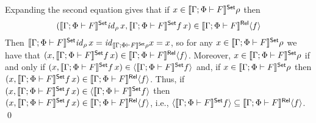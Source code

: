 \documentclass{lmcs}
\theoremstyle{plain}\newtheorem{satz}[thm]{Satz}
\renewcommand{\id}{\mathit{id}}
\begin{document}
{Expanding the second equation gives that if $x \in \llbracket{\Gamma;
  \Phi \vdash F}\rrbracket^{\mathsf{Set}}\rho$ then
\[(\setsem{\Gamma; \Phi \vdash F}\id_{\rho}\, x, \setsem{\Gamma;
  \Phi \vdash F} f\, x) \in \relsem{\Gamma; \Phi \vdash F}\graph{f}\]
Then $\setsem{\Gamma; \Phi \vdash F}\id_{\rho}\, x =
\id_{\setsem{\Gamma; \Phi \vdash F}\rho} x = x$, so for any $x \in
\llbracket{\Gamma; \Phi \vdash F}\rrbracket^{\mathsf{Set}}\rho$ we have that $(x, \llbracket{\Gamma;
  \Phi \vdash F}\rrbracket^{\mathsf{Set}}f\, x) \in \llbracket{\Gamma; \Phi \vdash F}\rrbracket^{\mathsf{Rel}}\langle {f} \rangle$.
Moreover, $x \in \llbracket{\Gamma; \Phi \vdash F}\rrbracket^{\mathsf{Set}}\rho$ if and only if
$(x, \llbracket{\Gamma; \Phi \vdash F}\rrbracket^{\mathsf{Set}} f\, x) \in \langle {\llbracket{\Gamma;
    \Phi \vdash F}\rrbracket^{\mathsf{Set}}f} \rangle$ and, if $x \in \llbracket{\Gamma; \Phi \vdash
  F}\rrbracket^{\mathsf{Set}}\rho$ then $(x, \llbracket{\Gamma; \Phi \vdash F}\rrbracket^{\mathsf{Set}} f\, x) \in
\llbracket{\Gamma; \Phi \vdash F}\rrbracket^{\mathsf{Rel}} \langle {f} \rangle$. Thus, if $(x, \llbracket{\Gamma;
  \Phi \vdash F}\rrbracket^{\mathsf{Set}} f\, x) \in \langle {\llbracket{\Gamma; \Phi \vdash F}\rrbracket^{\mathsf{Set}}f} \rangle$
then $(x, \llbracket{\Gamma; \Phi \vdash F}\rrbracket^{\mathsf{Set}} f\, x) \in \llbracket{\Gamma;
  \Phi \vdash F}\rrbracket^{\mathsf{Rel}} \langle {f} \rangle$, i.e., $\langle {\llbracket{\Gamma; \Phi \vdash
    F}\rrbracket^{\mathsf{Set}}f} \rangle \subseteq \llbracket{\Gamma; \Phi \vdash F}\rrbracket^{\mathsf{Rel}} \langle {f} \rangle$.  \qed

\begin{comment}

\begin{proof}
First observe that $(f, \id_{\rho'}) : \graph{f} \to \Eq_{\rho'}$ and
$(\id_{\rho}, f) : \Eq_{\rho} \to \graph{f}$ are morphisms of relation
environments.  Applying Lemma~\ref{lem:rel-transf-morph} to each of
these observations gives that
\begin{equation}\label{eq:graph-one}
(\setsem{\Gamma; \Phi \vdash F}f, \setsem{\Gamma; \Phi \vdash
    F}\id_{\rho'}) = \relsem{\Gamma; \Phi \vdash F} (f, \id_{\rho'}) :
  \relsem{\Gamma; \Phi \vdash F}\graph{f} \to \relsem{\Gamma; \Phi
    \vdash F}\Eq_{\rho'}
\end{equation}
and
\begin{equation}\label{eq:graph-two}
(\setsem{\Gamma; \Phi \vdash F}\id_{\rho}, \setsem{\Gamma; \Phi \vdash F}f)
= \relsem{\Gamma; \Phi \vdash F} (\id_{\rho}, f)
: \relsem{\Gamma; \Phi \vdash F}\Eq_{\rho} \to \relsem{\Gamma; \Phi \vdash F}\graph{f}
\end{equation}
Expanding Equation~\ref{eq:graph-one} gives that if
$(x,y) \in \relsem{\Gamma; \Phi \vdash F}\graph{f}$
then
\[(\setsem{\Gamma; \Phi \vdash F} f\, x, \setsem{\Gamma; \Phi \vdash
  F}\id_{\rho'}\, y) \in \relsem{\Gamma; \Phi \vdash F}\Eq_{\rho'}\]
Observe that $\setsem{\Gamma; \Phi \vdash F}\id_{\rho'}\, y =
\id_{\setsem{\Gamma; \Phi \vdash F}\rho'}\, y = y$ and
$\relsem{\Gamma; \Phi \vdash F}\Eq_{\rho'} = \Eq_{\setsem{\Gamma; \Phi
    \vdash F}\rho'}$. So, if $(x,y) \in \relsem{\Gamma; \Phi \vdash
  F}\graph{f}$ then $(\setsem{\Gamma; \Phi \vdash F} f\, x, y) \in
\Eq_{\setsem{\Gamma; \Phi \vdash F}\rho'}$, i.e., $\setsem{\Gamma;
  \Phi \vdash F} f\, x = y$, i.e., $(x, y) \in \graph{\setsem{\Gamma;
    \Phi \vdash F} f}$.  So, we have that $\relsem{\Gamma; \Phi \vdash
  F}\graph{f} \subseteq \graph{\setsem{\Gamma; \Phi \vdash F}f}$


\end{comment}}
\end{document}
